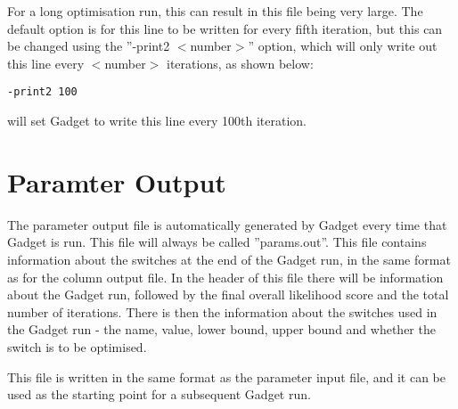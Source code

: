 \documentclass [a4paper, 10pt]{book}
\begin{document}
\bigskip
For a long optimisation run, this can result in this file being very large.  The default option is for this line to be written for every fifth iteration, but this can be changed using the ''-print2 $<$number$>$'' option, which will only write out this line every $<$number$>$ iterations, as shown below:

\begin{verbatim}
-print2 100
\end{verbatim}

will set Gadget to write this line every 100th iteration.

\section{Paramter Output}\label{sec:paramoutput}
The parameter output file is automatically generated by Gadget every time that Gadget is run.  This file will always be called ''params.out''.  This file contains information about the switches at the end of the Gadget run, in the same format as for the column output file.  In the header of this file there will be information about the Gadget run, followed by the final overall likelihood score and the total number of iterations.  There is then the information about the switches used in the Gadget run - the name, value, lower bound, upper bound and whether the switch is to be optimised.

\bigskip
This file is written in the same format as the parameter input file, and it can be used as the starting point for a subsequent Gadget run.
\end{document}
